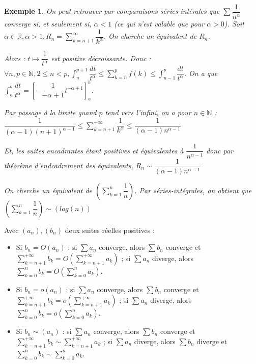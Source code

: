 \documentclass[a4paper,12pt]{book}
\newcommand{\Thr}[2]{\begin{tcolorbox}[sharp corners, colback=white,colframe=red!90!black!75, title=Théorème : #1]#2\end{tcolorbox}}
\newtheorem{Exe}{Exemple}[section]
\def\R{\mathbb{R}}
\def\N{\mathbb{N}}
\begin{document}
\begin{Exe}
On peut retrouver par comparaisons séries-intérales que $\sum \dfrac{1}{n^\alpha}$ converge si, et seulement si, $\alpha<1$ (ce qui n'est valable que pour $\alpha>0$). Soit $\alpha\in\R, \alpha>1,R_n = \sum_{k=n+1}^\infty \dfrac{1}{k^\alpha}$. On cherche un équivalent de $R_n$.
\par Alors : $t\mapsto \dfrac{1}{t^\alpha}$ est positive décroissante. Donc : $\forall n,p\in\N, 2\leq n<p,\int_n^{p+1}\dfrac{dt}{t^\alpha}\leq\sum\limits_{k=n}^pf(k)\leq\int_{n-1}^p\dfrac{dt}{t^\alpha}$. On a que $\int_a^b\dfrac{dt}{t^\alpha} = \left[-\dfrac{1}{-\alpha+1}t^{-\alpha+1}\right]_a^b$.
\par Par passage à la limite quand $p$ tend vers l'infini, on a pour $n\in\N$ : $\dfrac{1}{(\alpha-1)(n+1)^{\alpha-1}}\leq\sum\limits_{k=n+1}^{+\infty}\dfrac{1}{k^\alpha}\leq \dfrac{1}{(\alpha-1)n^{\alpha-1}}$
\par Et, les suites encadrantes étant positives et équivalentes à $\dfrac{1}{n^{\alpha-1}}$ donc par théorème d'endcadrement des équivalents, $R_n \sim\dfrac{1}{(\alpha-1)n^{\alpha-1}}$
\par On cherche un équivalent de $\left(\sum\limits_{k=1}^n\dfrac{1}{n}\right)$. Par séries-intégrales, on obtient que $\left(\sum\limits_{k=1}^n\dfrac{1}{n}\right)\sim (log(n))$
\end{Exe}
\Thr{Sommation des ordres de grandeur}{Avec $(a_n),(b_n)$ deux suites réelles positives :\begin{itemize}
    \item Si $b_n = O(a_n)$ : si $\sum a_n$ converge, alors $\sum b_n$ converge et $\sum\limits_{k=n+1}^{+\infty} b_k = O(\sum\limits_{k=n+1}^{+\infty} a_k)$ ; si $\sum a_n$ diverge, alors $\sum\limits_{k=0}^n b_k = O(\sum\limits_{k=0}^n a_k)$.
    \item Si $b_n = o(a_n)$ : si $\sum a_n$ converge, alors $\sum b_n$ converge et $\sum\limits_{k=n+1}^{+\infty} b_k = o(\sum\limits_{k=n+1}^{+\infty} a_k)$ ; si $\sum a_n$ diverge, alors $\sum\limits_{k=0}^n b_k = o(\sum\limits_{k=0}^n a_k)$.
    \item Si $b_n\sim(a_n)$ : si $\sum a_n$ converge, alors $\sum b_n$ converge et $\sum\limits_{k=n+1}^{+\infty} b_k \sim \sum\limits_{k=n+1}^{+\infty} a_k$ ; si $\sum a_n$ diverge, alors $\sum b_n$ diverge et $\sum\limits_{k=0}^n b_k \sim \sum\limits_{k=0}^n a_k$.
    \end{itemize}
}
\end{document}

